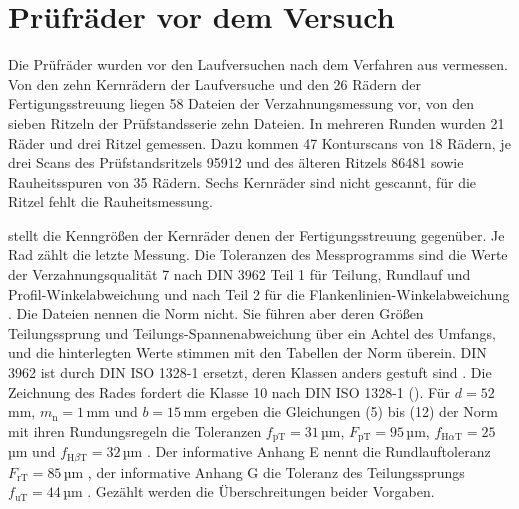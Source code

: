 \section{Prüfräder vor dem Versuch}
\label{sec:pruefraeder_vorher}

Die Prüfräder wurden vor den Laufversuchen nach dem Verfahren aus  vermessen. Von den zehn Kernrädern der Laufversuche und den 26 Rädern der Fertigungsstreuung liegen 58 Dateien der Verzahnungsmessung vor, von den sieben Ritzeln der Prüfstandsserie zehn Dateien. In mehreren Runden wurden 21 Räder und drei Ritzel gemessen. Dazu kommen 47 Konturscans von 18 Rädern, je drei Scans des Prüfstandsritzels 95912 und des älteren Ritzels 86481 sowie Rauheitsspuren von 35 Rädern. Sechs Kernräder sind nicht gescannt, für die Ritzel fehlt die Rauheitsmessung.

 stellt die Kenngrößen der Kernräder denen der Fertigungsstreuung gegenüber. Je Rad zählt die letzte Messung. Die Toleranzen des Messprogramms sind die Werte der Verzahnungsqualität 7 nach DIN 3962 Teil 1 für Teilung, Rundlauf und Profil-Winkelabweichung \cite[S.~3]{DIN3962-1} und nach Teil 2 für die Flankenlinien-Winkelabweichung \cite[S.~1]{DIN3962-2}. Die Dateien nennen die Norm nicht. Sie führen aber deren Größen Teilungssprung und Teilungs-Spannenabweichung über ein Achtel des Umfangs, und die hinterlegten Werte stimmen mit den Tabellen der Norm überein. DIN 3962 ist durch DIN ISO 1328-1 ersetzt, deren Klassen anders gestuft sind \cite[Nationales Vorwort, S.~4 bis 5]{DINISO1328-1}. Die Zeichnung des Rades fordert die Klasse 10 nach DIN ISO 1328-1 (). Für $d = 52$\,mm, $m_{\mathrm{n}} = 1$\,mm und $b = 15$\,mm ergeben die Gleichungen (5) bis (12) der Norm mit ihren Rundungsregeln die Toleranzen $f_{\mathrm{pT}} = 31$\,µm, $F_{\mathrm{pT}} = 95$\,µm, $f_{\mathrm{H}\alpha\mathrm{T}} = 25$\,µm und $f_{\mathrm{H}\beta\mathrm{T}} = 32$\,µm \cite[S.~36 bis 37]{DINISO1328-1}. Der informative Anhang E nennt die Rundlauftoleranz $F_{\mathrm{rT}} = 85$\,µm \cite[S.~53]{DINISO1328-1}, der informative Anhang G die Toleranz des Teilungssprungs $f_{\mathrm{uT}} = 44$\,µm \cite[S.~60]{DINISO1328-1}. Gezählt werden die Überschreitungen beider Vorgaben.

